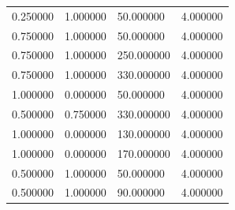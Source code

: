 \documentclass[12pt]{report}
\begin{document}
\begin{table}[h!]
\begin{center}
\begin{tabular}{|llll|}
			0.250000                      & 1.000000                   & 50.000000                 & 4.000000 \\
			0.750000                      & 1.000000                   & 50.000000                 & 4.000000 \\
			0.750000                      & 1.000000                   & 250.000000                & 4.000000 \\
			0.750000                      & 1.000000                   & 330.000000                & 4.000000 \\
			1.000000                      & 0.000000                   & 50.000000                 & 4.000000 \\
			0.500000                      & 0.750000                   & 330.000000                & 4.000000 \\
			1.000000                      & 0.000000                   & 130.000000                & 4.000000 \\
			1.000000                      & 0.000000                   & 170.000000                & 4.000000 \\
			0.500000                      & 1.000000                   & 50.000000                 & 4.000000 \\
			0.500000                      & 1.000000                   & 90.000000                 & 4.000000 \\ \hline
		\end{tabular}
	\end{center}
\end{table}

\newpage
\end{document}
